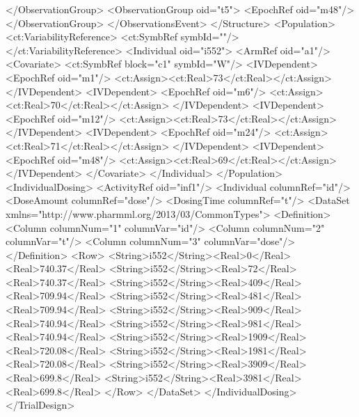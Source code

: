 \documentclass[a4paper,11pt]{article}
\begin{document}
\begin{xmlcode}
                </ObservationGroup>
                <ObservationGroup oid="t5">
                    <EpochRef oid="m48"/>
                </ObservationGroup>
            </ObservationsEvent>
        </Structure>
        <Population>
            <ct:VariabilityReference>
                <ct:SymbRef symbId=""/>
            </ct:VariabilityReference>
            <Individual oid="i552">
                <ArmRef oid="a1"/>
                <Covariate>
                    <ct:SymbRef block="c1" symbId="W"/>
                    <IVDependent>
                        <EpochRef oid="m1"/>
                        <ct:Assign><ct:Real>73</ct:Real></ct:Assign>
                    </IVDependent>
                    <IVDependent>
                        <EpochRef oid="m6"/>
                        <ct:Assign><ct:Real>70</ct:Real></ct:Assign>
                    </IVDependent>
                    <IVDependent>
                        <EpochRef oid="m12"/>
                        <ct:Assign><ct:Real>73</ct:Real></ct:Assign>
                    </IVDependent>
                    <IVDependent>
                        <EpochRef oid="m24"/>
                        <ct:Assign><ct:Real>71</ct:Real></ct:Assign>
                    </IVDependent>
                    <IVDependent>
                        <EpochRef oid="m48"/>
                        <ct:Assign><ct:Real>69</ct:Real></ct:Assign>
                    </IVDependent>
                </Covariate>
            </Individual>
        </Population>
        <IndividualDosing>
                <ActivityRef oid="inf1"/>
                <Individual columnRef="id"/>
                <DoseAmount columnRef="dose"/>
                <DosingTime columnRef="t"/>
                <DataSet xmlns="http://www.pharmml.org/2013/03/CommonTypes">
                    <Definition>
                        <Column columnNum="1" columnVar="id"/>
                        <Column columnNum="2" columnVar="t"/>
                        <Column columnNum="3" columnVar="dose"/>
                    </Definition>
                    <Row>
                        <String>i552</String><Real>0</Real><Real>740.37</Real>
                        <String>i552</String><Real>72</Real><Real>740.37</Real>
                        <String>i552</String><Real>409</Real><Real>709.94</Real>
                        <String>i552</String><Real>481</Real><Real>709.94</Real>
                        <String>i552</String><Real>909</Real><Real>740.94</Real>
                        <String>i552</String><Real>981</Real><Real>740.94</Real>
                        <String>i552</String><Real>1909</Real><Real>720.08</Real>
                        <String>i552</String><Real>1981</Real><Real>720.08</Real>
                        <String>i552</String><Real>3909</Real><Real>699.8</Real>
                        <String>i552</String><Real>3981</Real><Real>699.8</Real>
                    </Row>
                </DataSet>
        </IndividualDosing>
    </TrialDesign>
\end{xmlcode}
\end{document}
